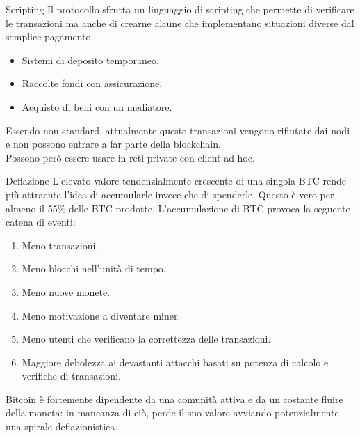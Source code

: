 \documentclass[italian]{beamer}
\begin{document}
\begin{frame}{Scripting}
Il protocollo sfrutta un linguaggio di scripting che permette di verificare le transazioni ma anche di crearne alcune che implementano situazioni diverse dal semplice pagamento.
\begin{itemize}
\item Sistemi di deposito temporaneo.
\item Raccolte fondi con assicurazione.
\item Acquisto di beni con un mediatore.
\end{itemize}
\bigskip
\pause
Essendo non-standard, attualmente queste transazioni vengono rifiutate dai nodi e non possono entrare a far parte della blockchain.\\
Possono però essere usare in reti private con client ad-hoc.
\end{frame}

\begin{frame}{Deflazione}
 L'elevato valore tendenzialmente crescente di una singola BTC rende più attraente l'idea di accumularle invece che di spenderle. Questo è vero per almeno il 55\% delle BTC prodotte. L'accumulazione di BTC provoca la seguente catena di eventi:
 \begin{enumerate}
  \item Meno transazioni. \pause
  \item Meno blocchi nell'unità di tempo. \pause
  \item Meno nuove monete. \pause
  \item Meno motivazione a diventare miner. \pause
  \item Meno utenti che verificano la correttezza delle transazioni. \pause
  \item Maggiore debolezza ai devastanti attacchi basati su potenza di calcolo e verifiche di transazioni. \pause
 \end{enumerate}
 Bitcoin è fortemente dipendente da una comunità attiva e da un costante fluire della moneta: in mancanza di ciò, perde il suo valore avviando potenzialmente una spirale deflazionistica.
\end{frame}
\end{document}

